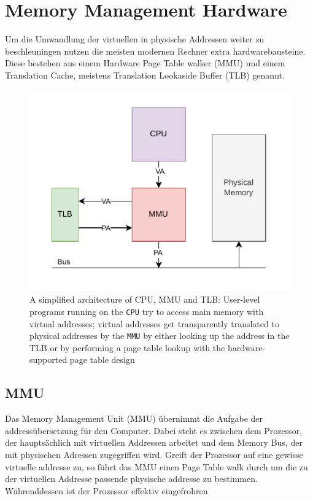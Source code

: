 \section{Memory Management Hardware}
Um die Umwandlung der virtuellen in physische Addressen weiter zu beschleuningen nutzen die meisten
modernen Rechner extra hardwarebausteine. Diese bestehen aus einem Hardware Page Table walker (MMU) und
einem Translation Cache, meistens Translation Lookaside Buffer (TLB) genannt\cite{jacobVirtualMemoryContemporary1998}.
\begin{figure}[t]
    \centering
    \includegraphics[scale=1.2]{figures/simple_mmu_arch.pdf}
    \caption[A simplified architecture of CPU, MMU and TLB]{A simplified architecture of CPU, MMU and TLB:
        User-level programs running on the \texttt{CPU} try to access main memory with virtual
        addresses; virtual addresses get transparently translated to physical addresses by the
        \texttt{MMU} by either looking up the address in the TLB or by performing a page table
        lookup with the hardware-supported page table design}
    \label{fig:fund:simplearch}
\end{figure}

\subsection{MMU}
Das Memory Management Unit (MMU) übernimmt die Aufgabe der addressübersetzung für den Computer.
Dabei steht es zwischen dem Prozessor, der hauptsächlich mit virtuellen Addressen arbeitet und dem
Memory Bus, der mit physischen Adressen zugegriffen wird. Greift der Prozessor auf eine gewisse
virtuelle addresse zu, so führt das MMU einen Page Table walk durch um die zu der virtuellen
Addresse passende physische addresse zu bestimmen. Währenddessen ist der Prozessor effektiv eingefrohren\cite{jacobVirtualMemoryContemporary1998}
